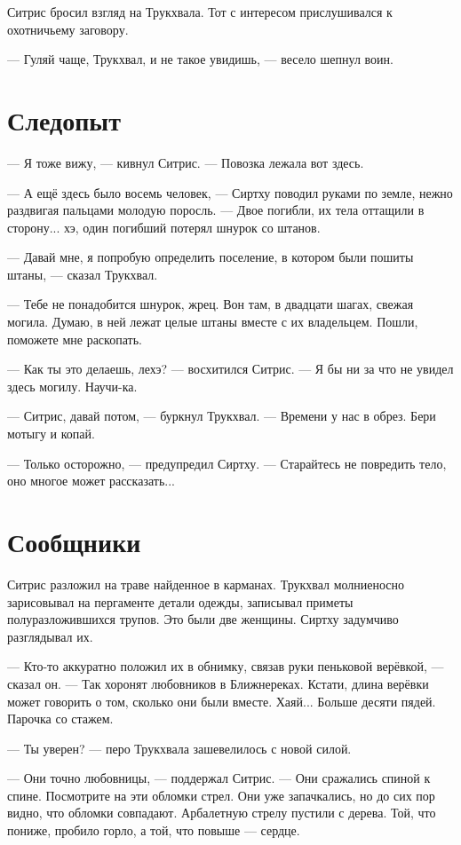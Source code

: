 \documentclass[a4paper,10pt,fleqn]{book}\usepackage{cooltooltips}\usepackage{polyglossia}\setdefaultlanguage{english}\setotherlanguage{russian}\defaultfontfeatures{Ligatures=TeX,Mapping=tex-text} \usepackage{xcolor}\definecolor{lightgray}{HTML}{bbbbbb}\color{lightgray}\newcommand{\ml}[3]{\textcolor{black}{#3}}
\begin{document}
Ситрис бросил взгляд на Трукхвала.
Тот с интересом прислушивался к охотничьему заговору.

--- Гуляй чаще, Трукхвал, и не такое увидишь, --- весело шепнул воин.

\section{Следопыт}

--- Я тоже вижу, --- кивнул Ситрис.
--- Повозка лежала вот здесь.

--- А ещё здесь было восемь человек, --- Сиртху поводил руками по земле, нежно раздвигая пальцами молодую поросль.
--- Двое погибли, их тела оттащили в сторону... хэ, один погибший потерял шнурок со штанов.

--- Давай мне, я попробую определить поселение, в котором были пошиты штаны, --- сказал Трукхвал.

--- Тебе не понадобится шнурок, жрец.
Вон там, в двадцати шагах, свежая могила.
Думаю, в ней лежат целые штаны вместе с их владельцем.
Пошли, поможете мне раскопать.

--- Как ты это делаешь, лехэ? --- восхитился Ситрис.
--- Я бы ни за что не увидел здесь могилу.
Научи-ка.

--- Ситрис, давай потом, --- буркнул Трукхвал.
--- Времени у нас в обрез.
Бери мотыгу и копай.

--- Только осторожно, --- предупредил Сиртху.
--- Старайтесь не повредить тело, оно многое может рассказать...

\section{Сообщники}

Ситрис разложил на траве найденное в карманах.
Трукхвал молниеносно зарисовывал на пергаменте детали одежды, записывал приметы полуразложившихся трупов.
Это были две женщины.
Сиртху задумчиво разглядывал их.

--- Кто-то аккуратно положил их в обнимку, связав руки пеньковой верёвкой, --- сказал он.
--- Так хоронят любовников в Ближнереках.
Кстати, длина верёвки может говорить о том, сколько они были вместе.
Хаяй...
Больше десяти пядей.
Парочка со стажем.

--- Ты уверен? --- перо Трукхвала зашевелилось с новой силой.

--- Они точно любовницы, --- поддержал Ситрис.
--- Они сражались спиной к спине.
Посмотрите на эти обломки стрел.
Они уже запачкались, но до сих пор видно, что обломки совпадают.
Арбалетную стрелу пустили с дерева.
Той, что пониже, пробило горло, а той, что повыше --- сердце.
\end{document}
